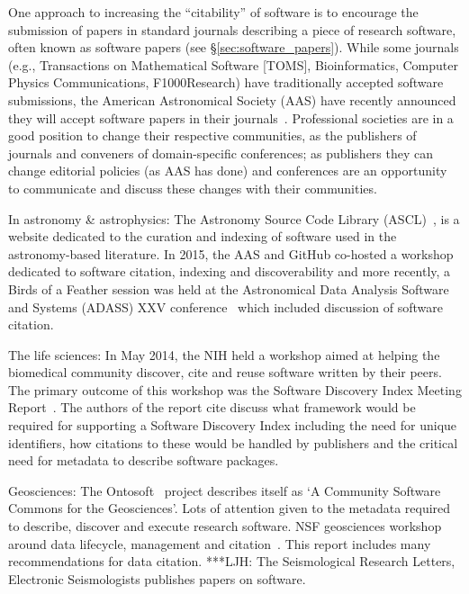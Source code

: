 \documentclass[11pt, oneside]{amsart}
\newcommand{\LJHnote}[1]{ {\textcolor{fuschsia} { ***LJH: #1 }}} %
\begin{document}
One approach to increasing the ``citability'' of software is to encourage the
submission of papers in standard journals describing a piece of research
software, often known as software papers (see \S\ref{sec:software_papers}).
While some journals (e.g., Transactions on Mathematical Software [TOMS], Bioinformatics, Computer Physics Communications, F1000Research) have traditionally accepted
software submissions, the American Astronomical Society (AAS) have recently
announced they will accept software papers in their journals~\cite{aas-sofware-papers}.
Professional societies are in a good position to change their respective communities, as the publishers of journals and conveners of domain-specific conferences; as publishers they can change editorial policies (as AAS has done) and conferences are an opportunity to communicate and discuss these changes with their communities.

In astronomy \& astrophysics: The Astronomy Source Code Library
(ASCL)~\cite{ascl}, is a website dedicated to the curation and indexing of
software used in the astronomy-based literature. In 2015, the AAS and GitHub
co-hosted a workshop~\cite{aas-software-index} dedicated to software citation,
indexing and discoverability and more recently, a Birds of a Feather session
was held at the Astronomical Data Analysis Software and Systems (ADASS) XXV
conference~\cite{2015arXiv151207919A} which included discussion of software
citation.

The life sciences: In May 2014, the NIH held a workshop aimed at helping the biomedical community discover, cite and reuse software written by their peers. The primary outcome of this workshop was the Software Discovery Index Meeting Report~\cite{software-discovery-index}. The authors of the report cite discuss what framework would be required for supporting a Software Discovery Index including the need for unique identifiers, how citations to these would be handled by publishers and the critical need for metadata to describe software packages.

Geosciences: The Ontosoft~\cite{ontosoft} project describes itself as `A Community Software Commons for the Geosciences'. Lots of attention given to the metadata
required to describe, discover and execute research software. NSF geosciences workshop around data lifecycle, management and citation~\cite{nsf-geo-data}. This report includes many recommendations for data citation.
\LJHnote{ The Seismological Research Letters, Electronic Seismologists publishes papers on software.} %
\end{document}
